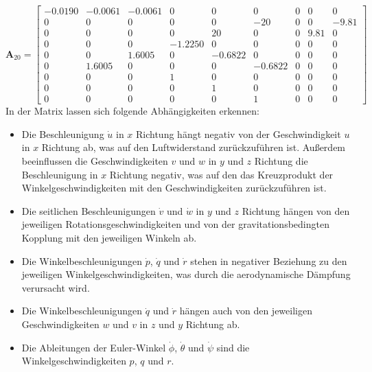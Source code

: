 \begin{equation}
\mathbf{A}_{20} =
\begin{bmatrix}
    -0.0190 &  -0.0061  & -0.0061  &    0     &     0     &     0    &     0    &     0    &     0 \\
          0  &      0    &     0    &     0    &     0     & -20 &     0    &     0    & -9.81 \\
          0  &      0    &     0    &     0    & 20   &     0    &     0    &  9.81 &     0 \\
          0  &      0    &     0    & -1.2250  &     0     &     0    &     0    &     0   &     0 \\
          0  &      0    &  1.6005  &     0    & -0.6822   &     0    &     0    &     0   &     0 \\
          0  &   1.6005  &     0    &     0    &     0     & -0.6822  &     0    &     0   &     0 \\
          0  &      0    &     0    &  1  &     0     &     0    &     0    &     0   &     0 \\
          0  &      0    &     0    &     0    &  1  &     0    &     0    &     0   &     0 \\
          0  &      0    &     0    &     0    &     0     &  1  &     0    &     0   &     0
\end{bmatrix}
\end{equation}
In der Matrix lassen sich folgende Abhängigkeiten erkennen:
\begin{itemize}
    \item Die Beschleunigung $\dot{u}$ in $x$ Richtung hängt negativ von der Geschwindigkeit $u$ in $x$ Richtung ab, was auf den Luftwiderstand zurückzuführen ist. Außerdem beeinflussen die Geschwindigkeiten $v$ und $w$ in $y$ und $z$ Richtung die Beschleunigung in $x$ Richtung negativ, was auf den das Kreuzprodukt der Winkelgeschwindigkeiten mit den Geschwindigkeiten zurückzuführen ist.
    \item Die seitlichen Beschleunigungen $\dot{v}$ und $\dot{w}$ in $y$ und $z$ Richtung hängen von den jeweiligen Rotationsgeschwindigkeiten und von der gravitationsbedingten Kopplung mit den jeweiligen Winkeln ab. 
    \item Die Winkelbeschleunigungen $\dot{p}$, $\dot{q}$ und $\dot{r}$ stehen in negativer Beziehung zu den jeweiligen Winkelgeschwindigkeiten, was durch die aerodynamische Dämpfung verursacht wird. 
    \item Die Winkelbeschleunigungen $\dot{q}$ und $\dot{r}$ hängen auch von den jeweiligen Geschwindigkeiten $w$ und $v$ in $z$ und $y$ Richtung ab.
    \item Die Ableitungen der Euler-Winkel $\dot{\phi}$, $\dot{\theta}$ und $\dot{\psi}$ sind die Winkelgeschwindigkeiten $p$, $q$ und $r$.
\end{itemize}
